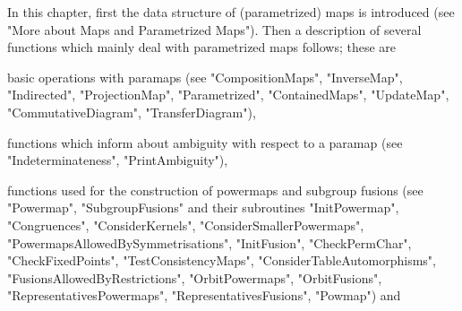 
In this chapter, first the data structure of (parametrized) maps is
introduced (see "More about Maps and Parametrized Maps").
Then a description of several functions which mainly deal with parametrized
maps follows; these are

basic operations with paramaps (see "CompositionMaps", "InverseMap",
"Indirected", "ProjectionMap", "Parametrized", "ContainedMaps",
"UpdateMap", "CommutativeDiagram", "TransferDiagram"),

functions which inform about ambiguity with respect to a paramap
(see "Indeterminateness", "PrintAmbiguity"),

functions used for the construction of powermaps and subgroup
fusions (see "Powermap", "SubgroupFusions" and their subroutines
"InitPowermap", "Congruences", "ConsiderKernels",
"ConsiderSmallerPowermaps", "PowermapsAllowedBySymmetrisations",
"InitFusion", "CheckPermChar", "CheckFixedPoints", "TestConsistencyMaps",
"ConsiderTableAutomorphisms", "FusionsAllowedByRestrictions",
"OrbitPowermaps", "OrbitFusions", "RepresentativesPowermaps",
"RepresentativesFusions", "Powmap") and

